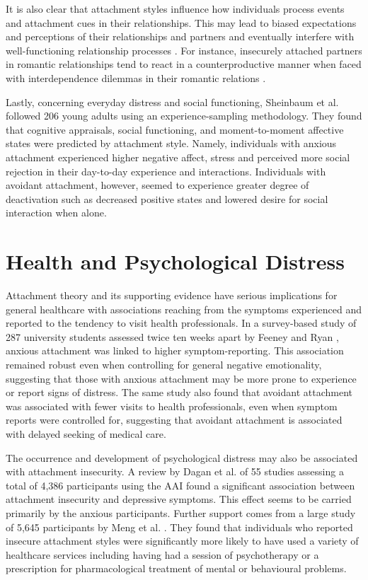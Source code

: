 \documentclass[12pt]{report}
\begin{document}
It is also clear that attachment styles influence how individuals process events and attachment cues in their relationships. This may lead to biased expectations and perceptions of their relationships and partners and eventually interfere with well-functioning relationship processes \cite{Collins2007, Collins2004, Hazan1994, Mikulincer2003, Rodriguez2019}.
For instance, insecurely attached partners in romantic relationships tend to react in a counterproductive manner when faced with interdependence dilemmas in their romantic relations \cite{Simpson2012}.

Lastly, concerning everyday distress and social functioning, Sheinbaum et al. \citeyear{Sheinbaum2015} followed 206 young adults using an experience-sampling methodology.
They found that cognitive appraisals, social functioning, and moment-to-moment affective states were predicted by attachment style.
Namely, individuals with anxious attachment experienced higher negative affect, stress and perceived more social rejection in their day-to-day experience and interactions. Individuals with avoidant attachment, however, seemed to experience greater degree of deactivation such as decreased positive states and lowered desire for social interaction when alone.

\section{Health and Psychological Distress}
\label{sec: Health}
Attachment theory and its supporting evidence have serious implications for general healthcare with associations reaching from the symptoms experienced and reported to the tendency to visit health professionals.
In a survey-based study of 287 university students assessed twice ten weeks apart by Feeney and Ryan \citeyear{Feeney1994}, anxious attachment was linked to higher symptom-reporting. This association remained robust even when controlling for general negative emotionality, suggesting that those with anxious attachment may be more prone to experience or report signs of distress.
The same study also found that avoidant attachment was associated with fewer visits to health professionals, even when symptom reports were controlled for, suggesting that avoidant attachment is associated with delayed seeking of medical care.

The occurrence and development of psychological distress may also be associated with attachment insecurity.
A review by Dagan et al. \citeyear{Dagan2018} of 55 studies assessing a total of 4,386 participants using the AAI found a significant association between attachment insecurity and depressive symptoms.
This effect seems to be carried primarily by the anxious participants.
Further support comes from a large study of 5,645 participants by Meng et al. \citeyear{Meng2015}.
They found that individuals who reported insecure attachment styles were significantly more likely to have used a variety of healthcare services including having had a session of psychotherapy or a prescription for pharmacological treatment of mental or behavioural problems.
\end{document}
